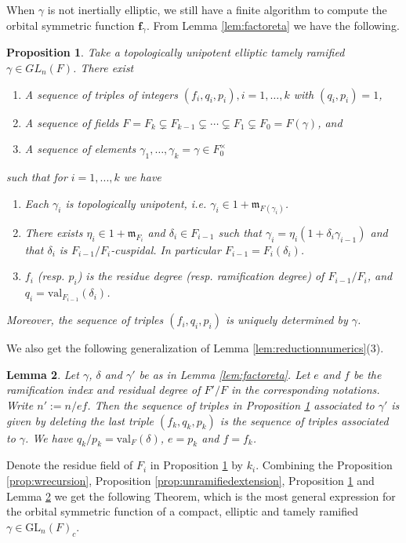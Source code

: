 \documentclass{amsart}
\numberwithin{equation}{section}
\newtheorem{lemma}{Lemma}[section]
\newtheorem{proposition}[lemma]{Proposition}%
\theoremstyle{definition}
\def\val{\mathrm{val}}
\def\GL{{\mathrm{GL}}}
\newcommand{\fgamma}{\mathbf{f}_{\gamma}}
\begin{document}
When $\gamma$ is not inertially elliptic, we still have a finite algorithm to compute the orbital symmetric function $\fgamma$. From Lemma \ref{lem:factoreta} we have the following.
\begin{proposition}
\label{prop:discreteinvariants}
    Take a topologically unipotent elliptic tamely ramified $\gamma\in GL_n(F)$. There exist
    \begin{enumerate}
        \item A sequence of triples of integers $(f_i, q_i, p_i), i=1,\ldots, k$ with $(q_i,p_i)=1$,
        \item A sequence of fields $F=F_k\subsetneq F_{k-1} \subsetneq \cdots\subsetneq F_1\subsetneq F_0=F(\gamma)$, and
        \item A sequence of elements $\gamma_1,\ldots, \gamma_{k}=\gamma\in F_0^{\times}$
    \end{enumerate}
    such that for $i=1,...,k$ we have
    \begin{enumerate}
\renewcommand{\labelenumi}{(\alph{enumi})}
        \item Each $\gamma_i$ is topologically unipotent, i.e. $\gamma_{i}\in 1+\mathfrak{m}_{F(\gamma_i)}$.
        \item There exists $\eta_i\in 1+\mathfrak{m}_{F_i}$ and $\delta_i\in F_{i-1}$ such that $\gamma_i=\eta_i(1+\delta_i\gamma_{i-1})$ and that $\delta_i$ is $F_{i-1}/F_i$-cuspidal. In particular $F_{i-1}=F_i(\delta_i)$.
        \item  $f_i$ (resp. $p_i$) is the residue degree (resp. ramification degree) of $F_{i-1}/F_i$, and $q_i=\val_{F_{i-1}}(\delta_i)$.
    \end{enumerate}
    Moreover, the sequence of triples $(f_i, q_i, p_i)$ is uniquely determined by $\gamma$.
\end{proposition}
We also get the following generalization of Lemma \ref{lem:reductionnumerics}(3).
\begin{lemma}\label{lem:reductionnumerics2}
Let $\gamma$, $\delta$ and $\gamma'$ be as in Lemma \ref{lem:factoreta}. Let $e$ and $f$ be the ramification index and residual degree of $F'/F$ in the corresponding notations. Write $n':=n/ef$. Then the sequence of triples in Proposition \ref{prop:discreteinvariants} associated to $\gamma'$ is given by deleting the last triple $(f_k,q_k,p_k)$ is the sequence of triples associated to $\gamma$. We have $q_k/p_k=\val_F(\delta)$, $e=p_k$ and $f=f_k$.
\end{lemma}

Denote the residue field of $F_i$ in Proposition \ref{prop:discreteinvariants} by $k_i$. Combining the Proposition \ref{prop:wrecursion}, Proposition \ref{prop:unramifiedextension}, Proposition \ref{prop:discreteinvariants} and Lemma \ref{lem:reductionnumerics2}  we get the following Theorem, which is the most general expression for the orbital symmetric function of a compact, elliptic and tamely ramified $\gamma \in \GL_n(F)_c$. 
\end{document}
